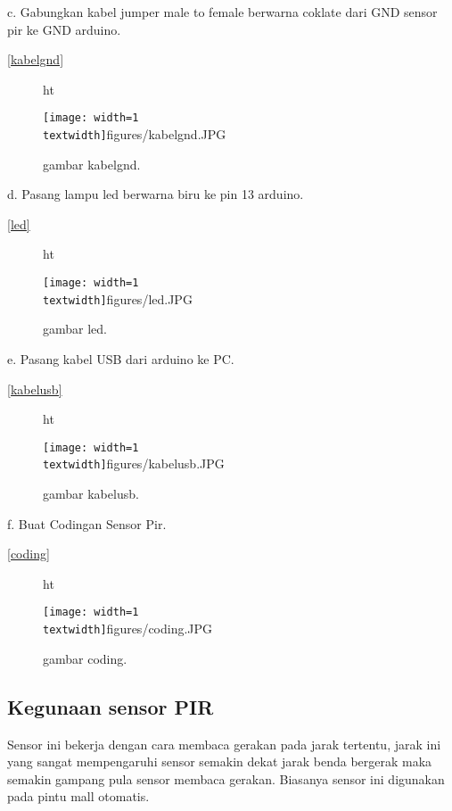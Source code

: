 c. Gabungkan kabel jumper male to female berwarna coklate dari GND sensor pir ke GND arduino.

\ref{kabelgnd}

\begin{figure} {ht}
\centerline{\texttt{[image: width=1\\textwidth]}{figures/kabelgnd.JPG}}
\caption{gambar kabelgnd.}
\label{kabelgnd.JPG}
\end{figure}

d. Pasang lampu led berwarna biru ke pin 13 arduino.

\ref{led}

\begin{figure} {ht}
\centerline{\texttt{[image: width=1\\textwidth]}{figures/led.JPG}}
\caption{gambar led.}
\label{led.JPG}
\end{figure}

e. Pasang kabel USB dari arduino ke PC.

\ref{kabelusb}

\begin{figure} {ht}
\centerline{\texttt{[image: width=1\\textwidth]}{figures/kabelusb.JPG}}
\caption{gambar kabelusb.}
\label{kabelusb.JPG}
\end{figure}

f. Buat Codingan Sensor Pir.

\ref{coding}

\begin{figure} {ht}
\centerline{\texttt{[image: width=1\\textwidth]}{figures/coding.JPG}}
\caption{gambar coding.}
\label{coding.JPG}
\end{figure}

\subsection {Kegunaan sensor PIR}
Sensor ini bekerja dengan cara membaca gerakan pada jarak tertentu, jarak ini yang sangat mempengaruhi sensor semakin dekat jarak benda bergerak maka semakin gampang pula sensor membaca gerakan.
Biasanya sensor ini digunakan pada pintu mall otomatis.

